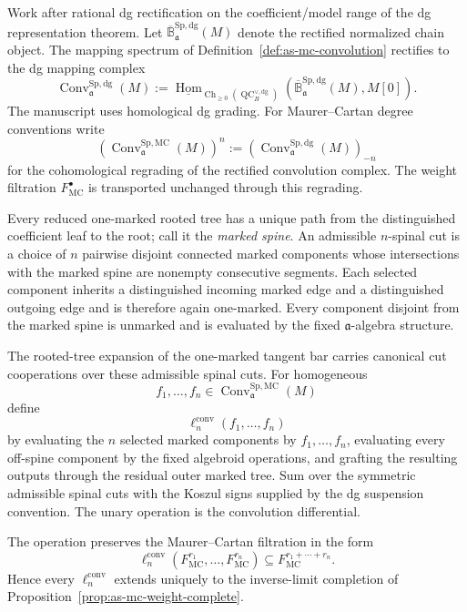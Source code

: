 \begin{construction}
\label{con:as-rational-convolution-linfty}
Work after rational dg rectification on the coefficient/model range of the dg
representation theorem.  Let
$\overline{\mathbb B}^{\mathrm{Sp,dg}}_{\mathfrak a}(M)$ denote the rectified
normalized chain object.  The mapping spectrum of
Definition~\ref{def:as-mc-convolution} rectifies to the dg mapping complex
\[
\boxed{
    \operatorname{Conv}^{\mathrm{Sp,dg}}_{\mathfrak a}(M)
    :=
    \underline{\operatorname{Hom}}_{
        \operatorname{Ch}_{\geq0}
        (\operatorname{QC}^{\vee,\mathrm{dg}}_B)}
    \left(
        \overline{\mathbb B}^{\mathrm{Sp,dg}}_{\mathfrak a}(M),
        M[0]
    \right).
}
\]
The manuscript uses homological dg grading.  For Maurer--Cartan degree
conventions write
\[
\boxed{
    \left(
        \operatorname{Conv}^{\mathrm{Sp,MC}}_{\mathfrak a}(M)
    \right)^n
    :=
    \left(
        \operatorname{Conv}^{\mathrm{Sp,dg}}_{\mathfrak a}(M)
    \right)_{-n}
}
\]
for the cohomological regrading of the rectified convolution complex.  The
weight filtration $F_{\mathrm{MC}}^\bullet$ is transported unchanged through
this regrading.

Every reduced one-marked rooted tree has a unique path from the distinguished
coefficient leaf to the root; call it the \emph{marked spine}.  An admissible
$n$-spinal cut is a choice of $n$ pairwise disjoint connected marked
components whose intersections with the marked spine are nonempty consecutive
segments.  Each selected component inherits a distinguished incoming marked
edge and a distinguished outgoing edge and is therefore again one-marked.
Every component disjoint from the marked spine is unmarked and is evaluated
by the fixed $\mathfrak a$-algebra structure.

The rooted-tree expansion of the one-marked tangent bar carries canonical cut
cooperations over these admissible spinal cuts.  For homogeneous
\[
    f_1,\ldots,f_n
    \in
    \operatorname{Conv}^{\mathrm{Sp,MC}}_{\mathfrak a}(M)
\]
define
\[
\boxed{
    \ell_n^{\mathrm{conv}}(f_1,\ldots,f_n)
}
\]
by evaluating the $n$ selected marked components by
$f_1,\ldots,f_n$, evaluating every off-spine component by the fixed
algebroid operations, and grafting the resulting outputs through the residual
outer marked tree.  Sum over the symmetric admissible spinal cuts with the
Koszul signs supplied by the dg suspension convention.  The unary operation
is the convolution differential.

The operation preserves the Maurer--Cartan filtration in the form
\[
\boxed{
    \ell_n^{\mathrm{conv}}
    \left(
        F_{\mathrm{MC}}^{r_1},\ldots,F_{\mathrm{MC}}^{r_n}
    \right)
    \subseteq
    F_{\mathrm{MC}}^{r_1+\cdots+r_n}.
}
\]
Hence every $\ell_n^{\mathrm{conv}}$ extends uniquely to the inverse-limit
completion of Proposition~\ref{prop:as-mc-weight-complete}.
\end{construction}

